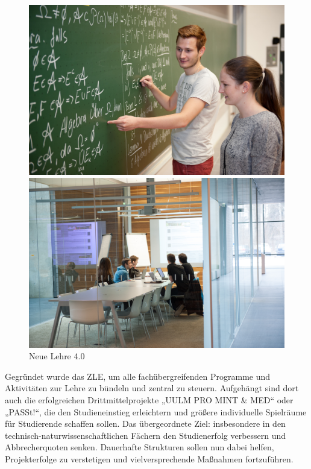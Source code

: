 \begin{figure}
    \begin{minipage}[b]{.5\linewidth} %
       \includegraphics[width=\linewidth]{rohmaterial-bilder/studenten-Tafel.jpg}
    \end{minipage}
    \begin{minipage}[b]{.5\linewidth} %
       \includegraphics[width=\linewidth]{rohmaterial-bilder/studenten-lernraum.jpg}
    \end{minipage}
    \caption{Neue Lehre 4.0}
 \end{figure}

Gegründet wurde das ZLE, um alle fachübergreifenden Programme und Aktivitäten zur Lehre zu bündeln und zentral zu steuern. Aufgehängt sind dort auch die erfolgreichen Drittmittelprojekte „UULM PRO MINT \& MED“ oder „PASSt!“, die den Studieneinstieg erleichtern und größere individuelle Spielräume für Studierende schaffen sollen. Das übergeordnete Ziel: insbesondere in den technisch-naturwissenschaftlichen Fächern den Studienerfolg verbessern und Abbrecherquoten senken. Dauerhafte Strukturen sollen nun dabei helfen, Projekterfolge zu verstetigen und vielversprechende Maßnahmen fortzuführen. 

